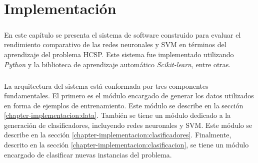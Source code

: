 \chapter{Implementación} \label{chapter-implementation}

\paragraph{} En este capítulo se presenta el sistema de software construido para evaluar el rendimiento comparativo de las redes neuronales y SVM en términos del aprendizaje del problema HCSP.
Este sistema fue implementado utilizando \textit{Python} y la biblioteca de aprendizaje automático \textit{Scikit-learn}, entre otras.

\paragraph{} La arquitectura del sistema está conformada por tres componentes fundamentales.
El primero es el módulo encargado de generar los datos utilizados en forma de ejemplos de entrenamiento.
Este módulo se describe en la sección \ref{chapter-implementacion:data}.
También se tiene un módulo dedicado a la generación de clasificadores, incluyendo redes neuronales y SVM.
Este módulo se describe en la sección \ref{chapter-implementacion:clasificadores}.
Finalmente, descrito en la sección \ref{chapter-implementacion:clasificacion}, se tiene un módulo encargado de clasificar nuevas instancias del problema.






